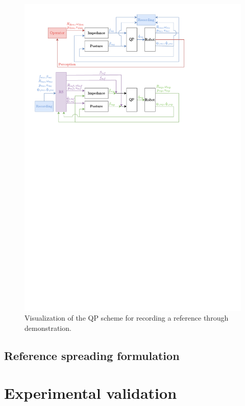 \documentclass[a4paper, 10pt, conference]{ieeeconf}
\begin{document}
    \begin{figure}[b]

    \includegraphics[trim={1cm 23.3cm 5cm 1cm}, clip]{Graphics/qp.pdf}
    \caption{Visualization of the QP scheme for recording a reference through demonstration.}
    \label{figurelabel}
   \end{figure}

    \subsection{Reference spreading formulation}
    \lipsum[2-30]
    \section{Experimental validation}
\end{document}
